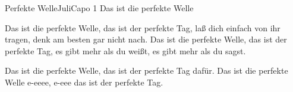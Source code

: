 \begin{song}{Perfekte Welle}{Juli}{Capo 1}
            Das ist die perfekte Welle

Das ist die perfekte
Welle, das ist der perfekte Tag, laß dich einfach von ihr
tragen, denk am besten gar nicht nach.
Das ist die perfekte Welle, das ist der perfekte Tag, es gibt mehr als du
weißt, es gibt mehr als du sagst.

Das ist die perfekte Welle, das ist der perfekte Tag dafür.
Das ist die perfekte Welle e-eeee, e-eee das ist der perfekte     Tag.

\end{song}